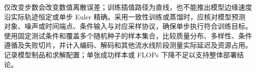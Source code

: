 \begin{exercises}
\begin{exercise}
\begin{solution}
仅改变步数会改变数值离散误差；训练插值路径为直线，也不能推出模型边缘速度沿实际轨迹恒定或单步 Euler 精确。采用一致性训练或蒸馏时，应核对模型预测对象、噪声或时间端点、条件输入与对应采样协议，确保单步执行符合训练目标。使用固定测试条件和覆盖多个随机种子的样本集合，比较质量分布、多样性、条件遵循及失败切片，并计入编码、解码和其他流水线阶段测量实际延迟及资源占用。记录模型制品和求解配置；单张成功样本或 FLOPs 下降不足以支持整体部署结论。
\end{solution}
\end{exercise}

\end{exercises}
